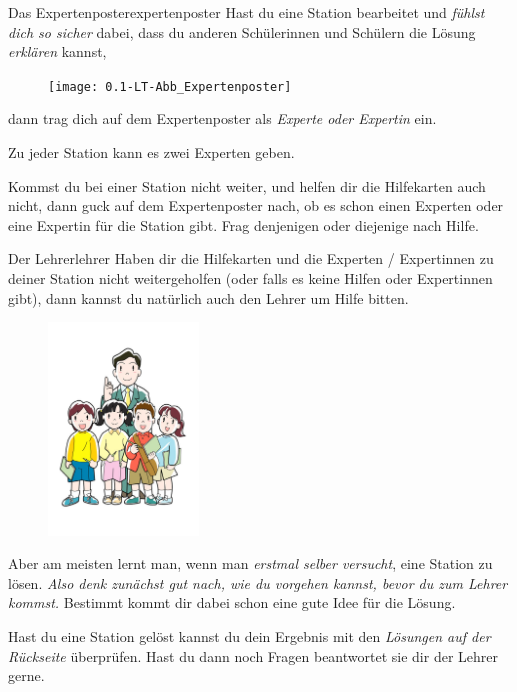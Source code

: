 \documentclass[lerntheke,12pt,a5paper,landscape]{arbeitsblatt}
\begin{document}
\begin{hilfekarte}{Das Expertenposter}{expertenposter}
Hast du eine Station bearbeitet und \emph{fühlst dich so sicher} dabei, dass du anderen Schülerinnen und Schülern die Lösung \emph{erklären} kannst, \begin{figure}
\texttt{[image: 0.1-LT-Abb\_Expertenposter]}
\end{figure}dann trag dich auf dem Expertenposter als \emph{Experte oder Expertin} ein.

\medskip
Zu jeder Station kann es zwei Experten geben.

\bigskip
Kommst du bei einer Station nicht weiter, und helfen dir die Hilfekarten auch nicht, dann guck auf dem Expertenposter nach, ob es schon einen Experten oder eine Expertin für die Station gibt. Frag denjenigen oder diejenige nach Hilfe.
\end{hilfekarte}

\leereKarte

\begin{hilfekarte}{Der Lehrer}{lehrer}
Haben dir die Hilfekarten und die Experten / Expertinnen zu deiner Station nicht weitergeholfen (oder falls es keine Hilfen oder Expertinnen gibt), dann kannst du natürlich auch den Lehrer um Hilfe bitten.

\medskip
\begin{figure}
\includegraphics[width=4cm]{0.1-LT-Abb_Lehrer}
\end{figure}
Aber am meisten lernt man, wenn man \emph{erstmal selber versucht}, eine Station zu lösen. \emph{Also denk zunächst gut nach, wie du vorgehen kannst, bevor du zum Lehrer kommst.} Bestimmt kommt dir dabei schon eine gute Idee für die Lösung.

\medskip
Hast du eine Station gelöst kannst du dein Ergebnis mit den \emph{Lösungen auf der Rückseite} überprüfen. Hast du dann noch Fragen beantwortet sie dir der Lehrer gerne.
\end{hilfekarte}

\leereKarte
\end{document}
